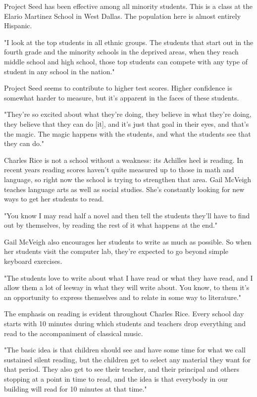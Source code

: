Project Seed has been effective among all minority students. This is a class at the Elario Martinez School in West Dallas. The population here is almost entirely Hispanic.

"I look at the top students in all ethnic groups. The students that start out in the fourth grade and the minority schools in the deprived areas, when they reach middle school and high school, those top students can compete with any type of student in any school in the nation."

Project Seed seems to contribute to higher test scores. Higher confidence is somewhat harder to measure, but it's apparent in the faces of these students.

"They're so excited about what they're doing, they believe in what they're doing, they believe that they can do [it], and it's just that goal in their eyes, and that's the magic. The magic happens with the students, and what the students see that they can do."

Charles Rice is not a school without a weakness: its Achilles heel is reading. In recent years reading scores haven't quite measured up to those in math and language, so right now the school is trying to strengthen that area. Gail McVeigh teaches language arts as well as social studies. She's constantly looking for new ways to get her students to read.

"You know I may read half a novel and then tell the students they'll have to find out by themselves, by reading the rest of it what happens at the end."

Gail McVeigh also encourages her students to write as much as possible. So when her students visit the computer lab, they're expected to go beyond simple keyboard exercises.

"The students love to write about what I have read or what they have read, and I allow them a lot of leeway in what they will write about. You know, to them it's an opportunity to express themselves and to relate in some way to literature."

The emphasis on reading is evident throughout Charles Rice. Every school day starts with 10 minutes during which students and teachers drop everything and read to the accompaniment of classical music.

"The basic idea is that children should see and have some time for what we call sustained silent reading, but the children get to select any material they want for that period. They also get to see their teacher, and their principal and others stopping at a point in time to read, and the idea is that everybody in our building will read for 10 minutes at that time."


